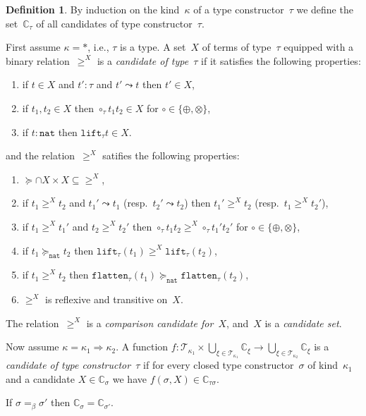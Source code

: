 \documentclass[a4paper,UKenglish,cleveref,autoref,numberwithinsect]{lipics-v2019}
\theoremstyle{definition}
\newtheorem{defn}[theorem]{Definition}
\newcommand{\arrkind}{\Rightarrow}
\newcommand{\nat}{\mathtt{nat}}
\newcommand{\flatten}{\mathtt{flatten}}
\newcommand{\lift}{\mathtt{lift}}
\newcommand{\Tc}{\mathcal{T}}
\newcommand{\Cb}{\mathbb{C}}
\begin{document}
\begin{defn}\label{def_wm_candidate}
  By induction on the kind~$\kappa$ of a type constructor~$\tau$ we
  define the set~$\Cb_\tau$ of all candidates of type
  constructor~$\tau$.

  First assume $\kappa=*$, i.e., $\tau$ is a type. A set~$X$ of terms
  of type~$\tau$ equipped with a binary relation~$\ge^X$ is a
  \emph{candidate of type~$\tau$} if it satisfies the following
  properties:
  \begin{enumerate}
  \item if $t \in X$ and $t' : \tau$ and $t' \leadsto t$ then $t' \in
    X$,
  \item if $t_1,t_2 \in X$ then $\circ_\tau t_1 t_2 \in X$ for $\circ
    \in \{\oplus,\otimes\}$,
  \item if $t : \nat$ then $\lift_\tau t \in X$.
  \end{enumerate}
  and the relation~$\ge^X$ satifies the following properties:
  \begin{enumerate}
  \item ${\succeq} \cap X \times X \subseteq {\ge^X}$,
  \item if $t_1 \ge^X t_2$ and $t_1' \leadsto t_1$ (resp.~$t_2'
    \leadsto t_2$) then $t_1' \ge^X t_2$ (resp.~$t_1 \ge^X t_2'$),
  \item if $t_1 \ge^X t_1'$ and $t_2 \ge^X t_2'$ then $\circ_\tau t_1
    t_2 \ge^X \circ_\tau t_1' t_2'$ for $\circ \in
    \{\oplus,\otimes\}$,
  \item if $t_1 \succeq_\nat t_2$ then $\lift_\tau(t_1) \ge^X
    \lift_\tau(t_2)$,
  \item if $t_1 \ge^X t_2$ then $\flatten_\tau(t_1) \succeq_\nat
    \flatten_\tau(t_2)$,
  \item $\ge^X$ is reflexive and transitive on~$X$.
  \end{enumerate}
  The relation~$\ge^X$ is a \emph{comparison candidate for~$X$},
  and~$X$ is a \emph{candidate set}.

  Now assume $\kappa = \kappa_1\arrkind\kappa_2$. A function $f :
  \Tc_{\kappa_1} \times \bigcup_{\xi\in\Tc_{\kappa_1}}\Cb_\xi \to
  \bigcup_{\xi\in\Tc_{\kappa_2}}\Cb_\xi$ is a \emph{candidate of type
    constructor~$\tau$} if for every closed type constructor~$\sigma$
  of kind~$\kappa_1$ and a candidate $X \in \Cb_\sigma$ we have
  $f(\sigma,X) \in \Cb_{\tau\sigma}$.
\end{defn}

\begin{lemma}\label{lem_beta_wm_candidate}
  If $\sigma =_\beta \sigma'$ then $\Cb_\sigma = \Cb_{\sigma'}$.
\end{lemma}
\end{document}
